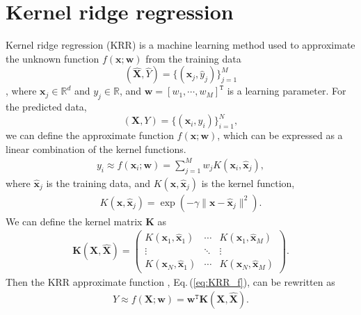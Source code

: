 \documentclass[%
twocolumn,
amsmath,amssymb,
groupedaddress,
reprint,%
]{revtex4-2}
\renewcommand{\>}{\rangle}
\newcommand{\<}{\langle}
\newcommand{\eq}[1]{Eq.\,(\ref{#1})}
\begin{document}
\section{Kernel ridge regression}
Kernel ridge regression (KRR) is a machine learning method used to approximate the unknown function $f(\bm{x}; \bm{w})$ from the training data
% 
\begin{equation}
	(\bm{\widehat{X}}, \widehat{Y}) = \{(\bm{\hat{x}}_{j}, \hat{y}_{j})\}_{j=1}^{M}
\end{equation}
% 
, where $\bm{x}_{j} \in \mathbb{R}^{d}$ and $y_{j} \in \mathbb{R}$, and $\bm{w} = [w_{1}, \cdots, w_{M}]^{\mathtt{T}}$ is a learning parameter.
% 
For the predicted data,
% 
\begin{equation}
	(\bm{X}, Y) = \{(\bm{x}_{i}, y_{i})\}_{i=1}^{N},
\end{equation}
% 
we can define the approximate function $f(\bm{x}; \bm{w})$, which can be expressed as a linear combination of the kernel functions.
% 
\begin{align}
	\label{eq:KRR_f}
	y_{i} \approx f(\bm{x}_{i}; \bm{w}) = \sum_{j=1}^{M} w_{j} K(\bm{x}_{i}, \bm{\hat{x}}_{j}),
\end{align}
% 
where $\bm{\hat{x}}_{j}$ is the training data, and $K(\bm{x}, \bm{\hat{x}}_{j})$ is the kernel function,
% 
\begin{align}
	\label{eq:KRR_kernel}
	K(\bm{x}, \bm{\hat{x}}_{j}) = \exp{(-\gamma \|\bm{x} - \bm{\hat{x}}_{j}\|^{2})}.
\end{align}
% 
We can define the kernel matrix $\bm{K}$ as
% 
\begin{align}
	\label{eq:KRR_K}
	\bm{K} (\bm{X}, \bm{\widehat{X}}) = \begin{pmatrix}
		                                    K(\bm{x}_{1}, \bm{\hat{x}}_{1}) & \cdots & K(\bm{x}_{1}, \bm{\hat{x}}_{M}) \\
		                                    \vdots                          & \ddots & \vdots                          \\
		                                    K(\bm{x}_{N}, \bm{\hat{x}}_{1}) & \cdots & K(\bm{x}_{N}, \bm{\hat{x}}_{M})
	                                    \end{pmatrix}.
\end{align}
Then the KRR approximate function , \eq{eq:KRR_f}, can be rewritten as
\begin{align}
	\label{eq:KRR_f_K}
	Y \approx f(\bm{X}; \bm{w}) = \bm{w}^{\mathtt{T}} \bm{K}(\bm{X}, \bm{\widehat{X}}).
\end{align}
\end{document}
